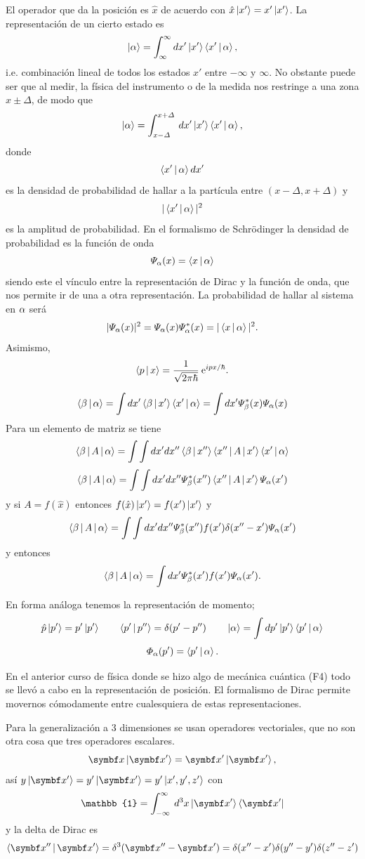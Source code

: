 \documentclass[10pt,oneside]{CBFT_book}
\begin{document}
El operador que da la posición es $\hat{x}$ de acuerdo con $\hat{x}\Ket{x'} = x'\Ket{x'}$.
La representación de un cierto estado es
\[
	\Ket{\alpha} = \int_{\infty}^\infty dx' \Ket{x'}\Braket{x'|\alpha},
\]
i.e. combinación lineal de todos los estados $x'$ entre $-\infty$ y $\infty$. No obstante puede
ser que al medir, la física del instrumento o de la medida nos restringe a una zona
$x \pm \Delta$, de modo que
\[
	\Ket{\alpha} = \int_{x-\Delta}^{x+\Delta} \: dx' \Ket{x'}\Braket{x'|\alpha},
\]
donde 
\[
	\Braket{x'|\alpha}dx'
\]
es la densidad de probabilidad de hallar a la partícula entre $(x-\Delta,x+\Delta)$ y 
\[
	|\Braket{x'|\alpha}|^2
\]
es la amplitud de probabilidad. 
En el formalismo de Schrödinger la densidad de probabilidad es la función de onda
\[
	\Psi_\alpha(x) = \Braket{x|\alpha}
\]
siendo este el vínculo entre la representación de Dirac y la función de onda,
que nos permite ir de una a otra representación.
La probabilidad de hallar al sistema en $\alpha$ será
\[
	| \Psi_\alpha(x) |^2 = \Psi_\alpha(x) \Psi^*_\alpha(x) = | \Braket{x|\alpha} |^2.
\]
Asimismo,
\[
	\Braket{p|x} = \frac{1}{\sqrt{2 \pi \hbar}} \:\mathrm{e}^{i p x / \hbar}.
\]

\[
	\Braket{\beta|\alpha} = \int dx' \Braket{\beta|x'}\Braket{x'|\alpha} = 
		\int dx' \Psi_\beta^*(x) \Psi_\alpha(x)
\]
Para un elemento de matriz se tiene
\[
	\Braket{\beta|A|\alpha} = 
	\int \int dx' dx''\Braket{\beta|x''}\Braket{x''|A|x'}\Braket{x'|\alpha}
\]
\[
	\Braket{\beta|A|\alpha} = 
	\int \int dx' dx'' \Psi_\beta^*(x'') \Braket{x''|A|x'} \Psi_\alpha(x')
\]
y si $A=f(\hat{x})$ entonces $f(\hat{x}) \Ket{x'} = f(x') \Ket{x'}$ y
\[
	\Braket{\beta|A|\alpha} = 
	\int \int dx' dx'' \Psi_\beta^*(x'') f(x')\delta(x''-x') \Psi_\alpha(x')
\]
y entonces 
\[
	\Braket{\beta|A|\alpha} = \int dx' \Psi_\beta^*(x') f(x') \Psi_\alpha(x').
\]

En forma análoga tenemos la representación de momento;
\[
	\hat{p}\Ket{p'} = p'\Ket{p'} \qquad \Braket{p'|p''} = \delta(p'-p'') \qquad 
	\Ket{\alpha} = \int dp' \Ket{p'}\Braket{p'|\alpha}
\]
\[
	\Phi_\alpha(p') = \Braket{p'|\alpha}.
\]

En el anterior curso de física donde se hizo algo de mecánica cuántica (F4) todo
se llevó a cabo en la representación de posición.
El formalismo de Dirac permite movernos cómodamente entre cualesquiera de estas
representaciones.

Para la generalización a 3 dimensiones se usan operadores vectoriales, que no son otra
cosa que tres operadores escalares.
\[
	\vb x \Ket{\vb{x}'} = \vb{x'} \Ket{\vb{x'}},
\]
así $y \Ket{\vb{x}'} = y' \Ket{\vb{x}'} = y' \Ket{x',y',z'}$ con
\[
	\mathbb{1} = \int_{-\infty}^{\infty} \: d^3x \KB{ \vb{x'} }{ \vb{x'} }
\]
y la delta de Dirac es
\[
	\Braket{\vb{x''}|\vb{x'}} = \delta^3(\vb{x''} - \vb{x'}) =
	\delta( x'' - x' )\delta( y'' - y' )\delta( z'' - z' )
\]
\end{document}
